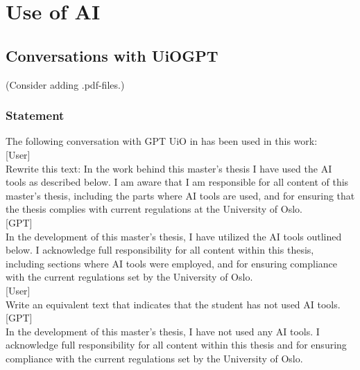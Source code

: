 \chapter{Use of AI}
\label{sec:second-app}
\begin{refsection}
\section{Conversations with UiOGPT}
(Consider adding .pdf-files.)

\subsection{Statement}
The following conversation with GPT UiO in \cite{uiogpt} has been used in this work:\\

[User]\\
Rewrite this text: In the work behind this master's thesis I have used the AI tools as described below. I am aware that I am responsible for all content of this master's thesis, including the parts where AI tools are used, and for ensuring that the thesis complies with current regulations at the University of Oslo.\\

[GPT]\\
In the development of this master's thesis, I have utilized the AI tools outlined below. I acknowledge full responsibility for all content within this thesis, including sections where AI tools were employed, and for ensuring compliance with the current regulations set by the University of Oslo.\\

[User]\\
Write an equivalent text that indicates that the student has not used AI tools.\\

[GPT]\\
In the development of this master's thesis, I have not used any AI tools. I acknowledge full responsibility for all content within this thesis and for ensuring compliance with the current regulations set by the University of Oslo.\\
\printbibliography[heading=subbibliography]
\end{refsection}